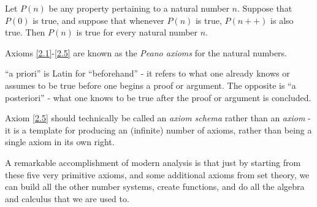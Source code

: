 \begin{axiom}\label{2.5}
    Let \(P(n)\) be any property pertaining to a natural number \(n\).
    Suppose that \(P(0)\) is true, and suppose that whenever \(P(n)\) is true, \(P(n++)\) is also true.
    Then \(P(n)\) is true for every natural number \(n\).
\end{axiom}

\begin{note}
    Axioms \ref{2.1}-\ref{2.5} are known as the \emph{Peano axioms} for the natural numbers.
\end{note}

\begin{note}
    ``a priori'' is Latin for ``beforehand''
    - it refers to what one already knows or assumes to be true before one begins a proof or argument.
    The opposite is ``a posteriori''
    - what one knows to be true after the proof or argument is concluded.
\end{note}

\begin{note}
    Axiom \ref{2.5} should technically be called an \emph{axiom schema} rather than an \emph{axiom}
    - it is a template for producing an (infinite) number of axioms, rather than being a single axiom in its own right.
\end{note}

\begin{note}
    A remarkable accomplishment of modern analysis is that just by starting from these five very primitive axioms, and some additional axioms from set theory, we can build all the other number systems, create functions, and do all the algebra and calculus that we are used to.
\end{note}